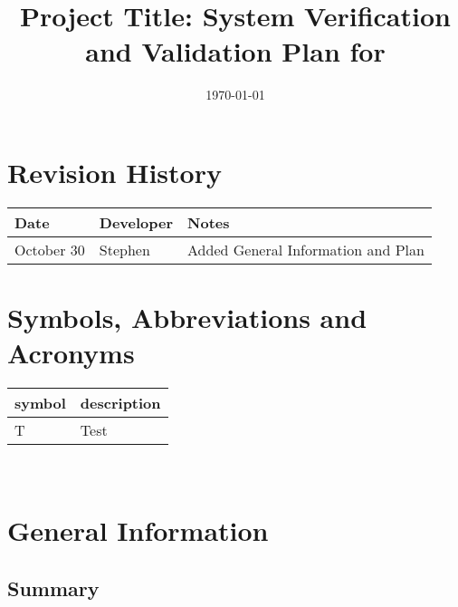 \documentclass[12pt, titlepage]{article}
\begin{document}
\title{Project Title: System Verification and Validation Plan for \progname{}} 
\author{\authname}
\date{\today}
	
\maketitle


\section{Revision History}

\begin{tabularx}{\textwidth}{p{3cm}p{2cm}X}
\toprule {\bf Date} & {\bf Developer} & {\bf Notes}\\
\midrule
October 30 & Stephen & Added General Information and Plan\\
\bottomrule
\end{tabularx}

\newpage

\tableofcontents



\newpage

\section{Symbols, Abbreviations and Acronyms}

\renewcommand{\arraystretch}{1.2}
\begin{tabular}{l l} 
  \toprule		
  \textbf{symbol} & \textbf{description}\\
  \midrule 
  T & Test\\
  \bottomrule
\end{tabular}\\


\newpage



\section{General Information}

\subsection{Summary}
\end{document}

